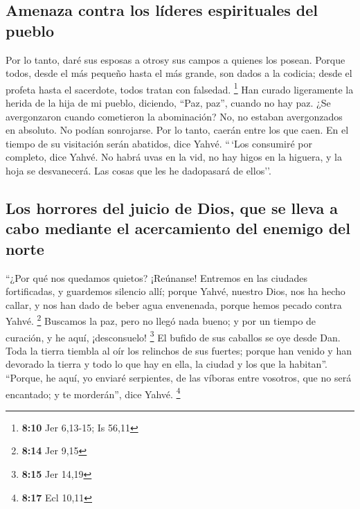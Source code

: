 \hypertarget{amenaza-contra-los-luxedderes-espirituales-del-pueblo}{%
\subsection{Amenaza contra los líderes espirituales del
pueblo}\label{amenaza-contra-los-luxedderes-espirituales-del-pueblo}}

 Por lo tanto, daré sus esposas a otrosy sus campos a
quienes los posean. Porque todos, desde el más pequeño hasta el más
grande, son dados a la codicia; desde el profeta hasta el sacerdote,
todos tratan con falsedad. \footnote{\textbf{8:10} Jer 6,13-15; Is 56,11}
 Han curado ligeramente la herida de la hija de mi
pueblo, diciendo, ``Paz, paz'', cuando no hay paz.  ¿Se
avergonzaron cuando cometieron la abominación? No, no estaban
avergonzados en absoluto. No podían sonrojarse. Por lo tanto, caerán
entre los que caen. En el tiempo de su visitación serán abatidos, dice
Yahvé.  ``\,`Los consumiré por completo, dice Yahvé. No
habrá uvas en la vid, no hay higos en la higuera, y la hoja se
desvanecerá. Las cosas que les he dadopasará de ellos''.

\hypertarget{los-horrores-del-juicio-de-dios-que-se-lleva-a-cabo-mediante-el-acercamiento-del-enemigo-del-norte}{%
\subsection{Los horrores del juicio de Dios, que se lleva a cabo
mediante el acercamiento del enemigo del
norte}\label{los-horrores-del-juicio-de-dios-que-se-lleva-a-cabo-mediante-el-acercamiento-del-enemigo-del-norte}}

 ``¿Por qué nos quedamos quietos? ¡Reúnanse! Entremos en
las ciudades fortificadas, y guardemos silencio allí; porque Yahvé,
nuestro Dios, nos ha hecho callar, y nos han dado de beber agua
envenenada, porque hemos pecado contra Yahvé. \footnote{\textbf{8:14}
  Jer 9,15}  Buscamos la paz, pero no llegó nada bueno; y
por un tiempo de curación, y he aquí, ¡desconsuelo! \footnote{\textbf{8:15}
  Jer 14,19}  El bufido de sus caballos se oye desde Dan.
Toda la tierra tiembla al oír los relinchos de sus fuertes; porque han
venido y han devorado la tierra y todo lo que hay en ella, la ciudad y
los que la habitan''.  ``Porque, he aquí, yo enviaré
serpientes, de las víboras entre vosotros, que no será encantado; y te
morderán'', dice Yahvé. \footnote{\textbf{8:17} Ecl 10,11}

